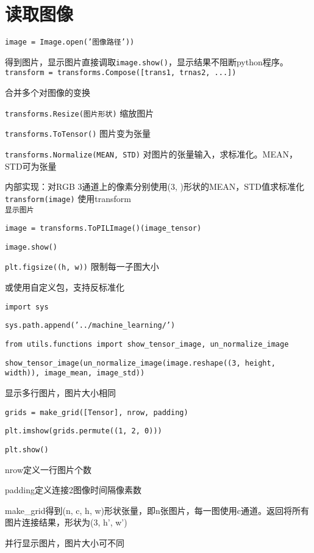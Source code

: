 \documentclass[UTF8]{ctexart}
\begin{document}
\section{读取图像}
\noindent \texttt{image = Image.open('图像路径'))}

  得到图片，显示图片直接调取\texttt{image.show()}，显示结果不阻断python程序。\\
\texttt{transform = transforms.Compose([trans1, trnas2, ...])}

  合并多个对图像的变换

  \texttt{transforms.Resize(图片形状)} 缩放图片

  \texttt{transforms.ToTensor()} 图片变为张量

  \texttt{transforms.Normalize(MEAN, STD)} 对图片的张量输入，求标准化。MEAN，STD可为张量
  
  \quad 内部实现：对RGB 3通道上的像素分别使用(3, )形状的MEAN，STD值求标准化\\
\texttt{transform(image)} 使用transform\\
\texttt{显示图片}

  \texttt{image = transforms.ToPILImage()(image\_tensor)}

  \texttt{image.show()}
  
  \texttt{plt.figsize((h, w))} 限制每一子图大小

  或使用自定义包，支持反标准化

  \texttt{import sys}

  \texttt{sys.path.append('../machine\_learning/')}

  \texttt{from utils.functions import show\_tensor\_image, un\_normalize\_image}

  \texttt{show\_tensor\_image(un\_normalize\_image(image.reshape((3, height, width)), image\_mean, image\_std))}

  显示多行图片，图片大小相同

  \quad \texttt{grids = make\_grid([Tensor], nrow, padding)}

  \quad \texttt{plt.imshow(grids.permute((1, 2, 0)))}

  \quad \texttt{plt.show()}
  
  \quad \quad nrow定义一行图片个数

  \quad \quad padding定义连接2图像时间隔像素数

  \quad \quad make\_grid得到(n, c, h, w)形状张量，即n张图片，每一图使用c通道。返回将所有图片连接结果，形状为(3, h', w')

  并行显示图片，图片大小可不同
\end{document}
